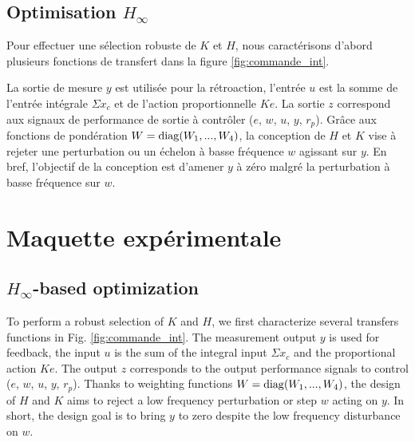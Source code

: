 \subsection{Optimisation \texorpdfstring{$H_{\infty}$}{H {infty}}} \label{sec:h_inf}
Pour effectuer une sélection robuste de $K$ et $H$, nous caractérisons d'abord plusieurs fonctions de transfert dans la figure \ref{fig:commande_int}.

La sortie de mesure $y$ est utilisée pour la rétroaction, l'entrée $u$ est la somme de l'entrée intégrale $\Sigma x_{c}$ et de l'action proportionnelle $K e$. La sortie $z$ correspond aux signaux de performance de sortie à contrôler ($e$, $w$, $u$, $y$, $r_{p}$). Grâce aux fonctions de pondération $W=\operatorname{diag} (W_{1},..., W_{4})$, la conception de $H$ et $K$ vise à rejeter une perturbation ou un échelon à basse fréquence $w$ agissant sur $y$. En bref, l'objectif de la conception est d'amener $y$ à zéro malgré la perturbation à basse fréquence sur $w$.

\section{Maquette expérimentale}



\subsection{\texorpdfstring{$H_{\infty}$}{H {infty}}-based optimization} \label{sec:h_inf}

To perform a robust selection of $K$ and $H$, we first characterize several transfers functions in Fig. \ref{fig:commande_int}.
The measurement output $y$ is used for feedback, the input $u$ is the sum of the integral input $\Sigma x_{c}$ and the proportional action $K e$. The output $z$ corresponds to the output performance signals to control ($e$, $w$, $u$, $y$, $r_{p}$). Thanks to weighting functions $W=\operatorname{diag} (W_{1},..., W_{4})$, the design of $H$ and $K$ aims to reject a low frequency perturbation or step $w$ acting on $y$. In short, the design goal is to bring $y$ to zero despite the low frequency disturbance on $w$. 

